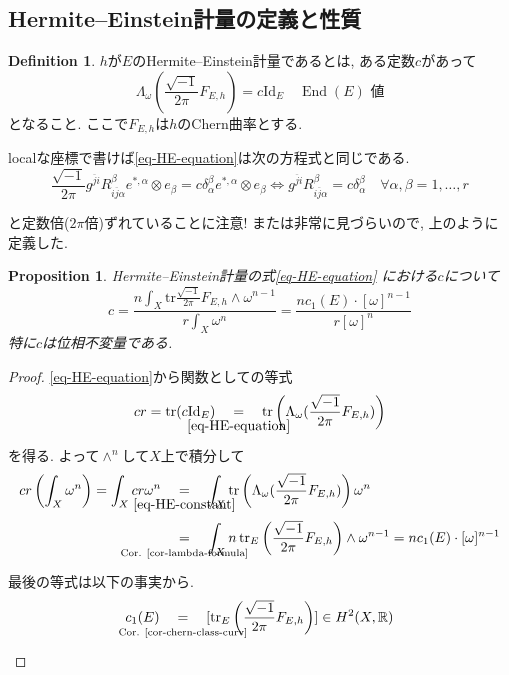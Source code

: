 \documentclass[dvipdfmx,a4paper,11pt]{article} %
\newtheorem{prop}[thm]{Proposition}
\theoremstyle{definition}
\newtheorem{defn}[thm]{Definition}
\theoremstyle{remark}
\numberwithin{equation}{section}
\newcommand{\End}[0]{\operatorname{End}}
\newcommand{\underalign}[2]{\quad \underset{\mathclap{\strut #1}}{#2}\quad}
\newcommand{\R}{\mathbb{R}}
\begin{document}
\subsection{Hermite--Einstein計量の定義と性質}
\begin{defn}
$h$が$E$のHermite--Einstein計量であるとは, ある定数$c$があって
\begin{equation}
\label{eq-HE-equation}
\Lambda_{\omega}(\frac{\sqrt{-1}}{2\pi}F_{E,h})=
c \mathrm{Id}_E
\quad \text{\(\End(E)\) 値}
\end{equation}
となること. ここで$F_{E,h}$は$h$のChern曲率とする. 

localな座標で書けば\eqref{eq-HE-equation}は次の方程式と同じである.
$$
\frac{\sqrt{-1}}{2\pi}
g^{\overline{j}i}
R_{i\overline{j}\alpha}^{\beta} 
e^{*,\alpha}\otimes e_{\beta}
=c \delta_{\alpha}^{\beta} e^{*,\alpha}\otimes e_{\beta}
\Leftrightarrow 
g^{\overline{j}i}
R_{i\overline{j}\alpha}^{\beta} 
=c \delta_{\alpha}^{\beta}
\quad
 \forall \alpha, \beta=1, \ldots, r
$$
\end{defn}
\cite[Chapter 4]{Kob14}と定数倍($2\pi$倍)ずれていることに注意!
また\cite[Chapter 4]{Kob14}は非常に見づらいので, 上のように定義した.

\begin{prop}
\label{prop-HE-const}
Hermite--Einstein計量の式\eqref{eq-HE-equation}
における$c$について
$$
c=\frac{ n\int_X  \mathrm{tr} \frac{\sqrt{-1}}{2\pi}F_{E,h}\wedge \omega^{n-1} }{r \int_{X} \omega^n}
=\frac{nc_1(E) \cdot [\omega]^{n-1}}{r[\omega]^n}
$$
特に$c$は位相不変量である. 
\end{prop}
\begin{proof}
\eqref{eq-HE-equation}から関数としての等式
\begin{equation}
\label{eq-HE-constant}
cr=\mathrm{tr}(c \mathrm{Id}_E)
\underalign{\eqref{eq-HE-equation}}{=}
\mathrm{tr}\left(\Lambda_{\omega}(\frac{\sqrt{-1}}{2\pi}F_{E,h})\right)
\end{equation}
を得る. 
よって$\wedge^{n}$して$X$上で積分して
\begin{align*}
cr\left(\int_{X}\omega^{n}\right)
=\int_{X}cr\omega^{n}
&\underalign{\eqref{eq-HE-constant}}{=}
\int_X \mathrm{tr}\left(\Lambda_{\omega}(\frac{\sqrt{-1}}{2\pi}F_{E,h})\right) 
\omega^n
\\
&\underalign{\text{Cor. \ref{cor-lambda-formula}}}{=}
\int_X 
 n\,\mathrm{tr}_E
 \left(\frac{\sqrt{-1}}{2\pi} F_{E,h} \right)\wedge \omega^{n-1}
 =n c_1(E) \cdot [\omega]^{n-1}
\end{align*}
最後の等式は以下の事実から. 
$$
c_1(E)\underalign{\text{Cor. \ref{cor-chern-class-curv}}}{=}
[\mathrm{tr}_E
 \left(\frac{\sqrt{-1}}{2\pi} F_{E,h} \right)] \in H^2(X, \R)
$$

\end{proof}
\end{document}
